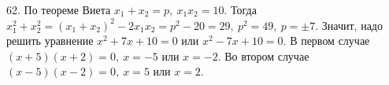 62. По теореме Виета $x_1+x_2=p,\ x_1x_2=10.$ Тогда $x_1^2+x_2^2=(x_1+x_2)^2-2x_1x_2=p^2-20=29,\ p^2=49,\ p=\pm7.$ Значит, надо решить уравнение $x^2+7x+10=0$ или  $x^2-7x+10=0.$ В первом случае $(x+5)(x+2)=0,\ x=-5$ или $x=-2.$ Во втором случае $(x-5)(x-2)=0,\ x=5$ или $x=2.$\\
